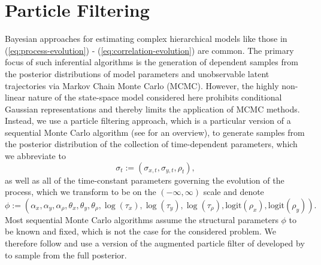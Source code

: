 \documentclass[10pt]{article}
\begin{document}
\section{Particle Filtering} \label{particle-filtering}
Bayesian approaches for estimating complex hierarchical models like
those in (\ref{eq:process-evolution}) -
(\ref{eq:correlation-evolution}) are common. The primary focus of such
inferential algorithms is the generation of dependent samples from the
posterior distributions of model parameters and unobservable latent
trajectories via Markov Chain Monte Carlo (MCMC). However, the highly
non-linear nature of the state-space model considered here prohibits
conditional Gaussian representations and thereby limits the
application of MCMC methods. Instead, we use a particle filtering
approach, which is a particular version of a sequential Monte Carlo
algorithm (see \cite{doucet2001sequential} for an overview), to
generate samples from the posterior distribution of the collection of
time-dependent parameters, which we abbreviate to
\[
  \sigma_t := (\sigma_{x,t}, \sigma_{y,t}, \rho_t),
\]
as well as all of the time-constant parameters governing the evolution
of the process, which we transform to be on the $(-\infty, \infty)$
scale and denote
\[
  \phi := (\alpha_x, \alpha_y, \alpha_\rho, \theta_x, \theta_y,
  \theta_\rho, \log(\tau_x), \log(\tau_y), \log(\tau_\rho),
  \mbox{logit}(\rho_x), \mbox{logit}(\rho_y)).
\]
Most sequential Monte Carlo algorithms assume the structural
parameters $\phi$ to be known and fixed, which is not the case for the
considered problem. We therefore follow \cite{rodriguez2012} and use a
version of the augmented particle filter of \cite{pitt1999filtering}
developed by \cite{liu2001combined} to sample from the full
posterior.
\end{document}
